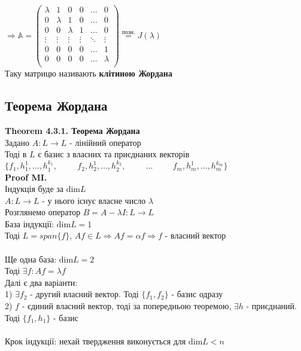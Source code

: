 \documentclass[a4paper, 14pt]{extarticle}
\def\th#1{\textbf{Theorem {#1}}}
\def\proofMI{\textbf{Proof MI.}\\}
\def\dim#1{\textrm{dim} {#1}}
\begin{document}
$\Rightarrow \mathbb{A} = \begin{pmatrix}
\lambda & 1 & 0 & 0 & \dots & 0 \\
0 & \lambda & 1 & 0 & \dots & 0 \\
0 & 0 & \lambda & 1 & \dots & 0 \\
\vdots & \vdots & \vdots & \vdots & \ddots & \vdots \\
0 & 0 & 0 & 0 & \dots & 1 \\
0 & 0 & 0 & 0 & \dots & \lambda \\
\end{pmatrix} \overset{\textrm{позн.}}{=} J(\lambda)$\\
Таку матрицю називають \textbf{клітиною Жордана}

\subsection{Теорема Жордана}
\th{4.3.1. Теорема Жордана}\\
Задано $A: L \to L$ - лінійний оператор\\
Тоді в $L$ є базис з власних та приєднаних векторів\\
$\{f_1, h_1^1, \dots ,h_1^{k_1}, \hspace{1cm} f_2, h_2^1, \dots, h_2^{k_2}, \hspace{1cm} \dots \hspace{1cm} f_m, h_m^{1}, \dots, h_m^{k_m}\}$\\
\proofMI
Індукція буде за $\dim L$\\
$A: L \to L$ - у нього існує власне число $\lambda$\\
Розглянемо оператор $B = A -\lambda I: L \to L$\\
База індукції: $\dim L = 1$\\
Тоді $L = span\{f\}$, $Af \in L \Rightarrow Af = \alpha f \Rightarrow f$ - власний вектор
\\
\\
Ще одна база: $\dim L = 2$\\
Тоді $\exists f: Af = \lambda f$\\
Далі є два варіанти:\\
1) $\exists f_2$ - другий власний вектор. Тоді $\{f_1,f_2\}$ - базис одразу\\
2) $f$ - єдиний власний вектор, тоді за попередньою теоремою, $\exists h$ - приєднаний. Тоді $\{f_1,h_1\}$ - базис\\
\\
Крок індукції: нехай твердження виконується для $\dim L < n$\\
\end{document}
